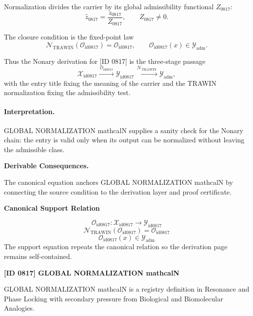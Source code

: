 Normalization divides the carrier by its global admissibility functional $Z_{0817}$:\[
\widehat{z}_{0817}=\frac{z_{0817}}{Z_{0817}},\qquad Z_{0817}\neq 0.
\]

The closure condition is the fixed-point law\[
\mathcal{N}_{\mathrm{TRAWIN}}(\mathcal{O}_{\mathrm{id0817}})=\mathcal{O}_{\mathrm{id0817}},\qquad \mathcal{O}_{\mathrm{id0817}}(x)\in\mathcal{Y}_{\mathrm{adm}}.
\]

Thus the Nonary derivation for [ID 0817] is the three-stage passage
\[
\mathcal{X}_{\mathrm{id0817}}\xrightarrow{\,\mathcal{O}_{\mathrm{id0817}}\,} \mathcal{Y}_{\mathrm{id0817}}\xrightarrow{\,\mathcal{N}_{\mathrm{TRAWIN}}\,} \mathcal{Y}_{\mathrm{adm}},
\]
with the entry title fixing the meaning of the carrier and the TRAWIN normalization fixing the admissibility test.

\paragraph{Interpretation.} GLOBAL NORMALIZATION mathcalN supplies a sanity check for the Nonary chain: the entry is valid only when its output can be normalized without leaving the admissible class.

\par\vspace{0.35em}
\noindent\textbf{Derivable Consequences.}\quad
\begingroup
\footnotesize
\raggedright
The canonical equation anchors GLOBAL NORMALIZATION mathcalN by connecting the source condition to the derivation layer and proof certificate.
\par\endgroup

\noindent\textbf{Canonical Support Relation}\par
\[
\mathcal{O}_{\mathrm{id0817}}:\mathcal{X}_{\mathrm{id0817}}\longrightarrow\mathcal{Y}_{\mathrm{id0817}}
\]
\[
\mathcal{N}_{\mathrm{TRAWIN}}(\mathcal{O}_{\mathrm{id0817}})=\mathcal{O}_{\mathrm{id0817}}
\]
\[
\mathcal{O}_{\mathrm{id0817}}(x)\in\mathcal{Y}_{\mathrm{adm}}
\]
\noindent The support equation repeats the canonical relation so the derivation page remains self-contained.\par

\clearpage
\noindent\textbf{[ID 0817] GLOBAL NORMALIZATION mathcalN}\par
\vspace{0.35em}
\begingroup\small
{}
GLOBAL NORMALIZATION mathcalN is a registry definition in Resonance and Phase Locking with secondary pressure from Biological and Biomolecular Analogies.

